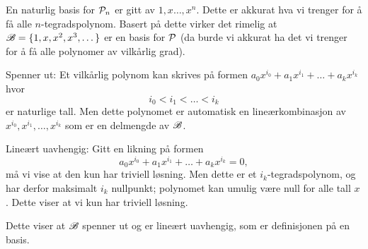 \begin{losning}



\begin{punkt}
En naturlig basis for $\P_n$ er gitt av $1,x\dots,x^n$. Dette er akkurat hva vi trenger for å få alle $n$-tegradspolynom. Basert på dette virker det rimelig at $\B=\{1,x,x^2,x^3,\dots\}$ er en basis for $\P$ (da burde vi akkurat ha det vi trenger for å få alle polynomer av vilkårlig grad). 
\end{punkt}

\begin{punkt}
Spenner ut: Et vilkårlig polynom kan skrives på formen $a_0x^{i_0}+a_1x^{i_1}+\dots +a_kx^{i_k}$ hvor $$i_0<i_1<\dots<i_k$$ er naturlige tall. Men dette polynomet er automatisk en lineærkombinasjon av $x^{i_0},x^{i_1},\dots,x^{i_k}$ som er en delmengde av $\B$.

\noindent
Lineært uavhengig: Gitt en likning på formen $$a_0x^{i_0}+a_1x^{i_1}+\dots +a_kx^{i_k}=0,$$ må vi vise at den kun har triviell løsning. Men dette er et $i_k$-tegradspolynom, og har derfor maksimalt $i_k$ nullpunkt; polynomet kan umulig være null for alle tall $x$. Dette viser at vi kun har triviell løsning.

\noindent
Dette viser at $\B$ spenner ut og er lineært uavhengig, som er definisjonen på en basis.
\end{punkt}

\end{losning}







